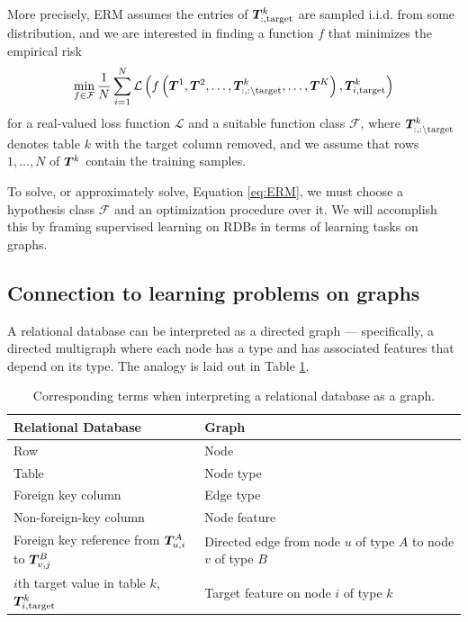 \documentclass{article}
\begin{document}
More precisely, ERM assumes the entries of ${\bm{T}}^k_{:, \text{target}}$ are sampled i.i.d. from some distribution, and we are interested in finding a function $f$ that minimizes the empirical risk
\begin{equation}\label{eq:ERM}
\min_{f \in \mathcal{F}} \frac{1}{N} \sum_{i=1}^N \mathcal{L}\left( f \left({\bm{T}}^1, {\bm{T}}^2, \ldots, 
{\bm{T}}^k_{:, : \setminus \text{target}}, \ldots, {\bm{T}}^K \right), {\bm{T}}^k_{i, \text{target}} \right)
\end{equation}
for a real-valued loss function $\mathcal{L}$ and a suitable function class $\mathcal{F}$, where ${\bm{T}}^k_{:, : \setminus \text{target}}$ denotes table $k$ with the target column removed, and we assume that rows $1, \ldots, N$ of ${\bm{T}}^k$ contain the training samples. 

To solve, or approximately solve, Equation \ref{eq:ERM}, we must choose a hypothesis class $\mathcal{F}$ and an optimization procedure over it.  We will accomplish this by framing supervised learning on RDBs in terms of learning tasks on graphs.

\subsection{Connection to learning problems on graphs}\label{sec:RDBasGraph}

A relational database can be interpreted as a directed graph --- specifically, a directed multigraph where each node has a type and has associated features that depend on its type.  The analogy is laid out in Table \ref{tab:RDBisGNN}.

\begin{table}[h]
\caption{Corresponding terms when interpreting a relational database as a graph.}
\label{tab:RDBisGNN}
\begin{tabular}{@{}ll@{}}
\toprule
\textbf{Relational Database} & \textbf{Graph} \\ \midrule
Row & Node \\
Table & Node type \\
Foreign key column & Edge type \\
Non-foreign-key column & Node feature \\
Foreign key reference from ${\bm{T}}^A_{u,i}$ to ${\bm{T}}^B_{v,j}$  & Directed edge from node $u$ of type $A$ to node $v$ of type $B$ \\
$i$th target value in table $k$, ${\bm{T}}^k_{i, \text{target}}$ & Target feature on node $i$ of type $k$ \\
\bottomrule
\end{tabular}
\end{table}
\end{document}
